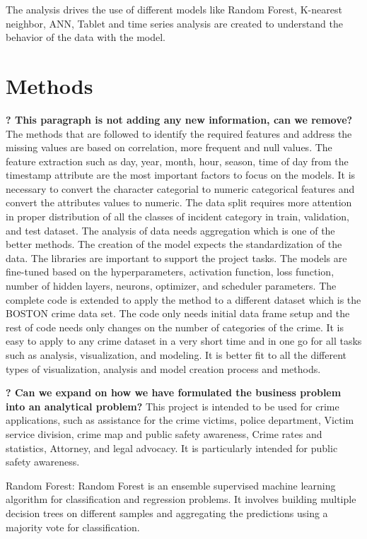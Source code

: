 \documentclass[conference,final,]{IEEEtran}
\begin{document}
The analysis drives the use of different models like Random Forest,
K-nearest neighbor, ANN, Tablet and time series analysis are created to
understand the behavior of the data with the model.

\section{Methods}\label{methods}

\textbf{? This paragraph is not adding any new information, can we
remove?} The methods that are followed to identify the required features
and address the missing values are based on correlation, more frequent
and null values. The feature extraction such as day, year, month, hour,
season, time of day from the timestamp attribute are the most important
factors to focus on the models. It is necessary to convert the character
categorial to numeric categorical features and convert the attributes
values to numeric. The data split requires more attention in proper
distribution of all the classes of incident category in train,
validation, and test dataset. The analysis of data needs aggregation
which is one of the better methods. The creation of the model expects
the standardization of the data. The libraries are important to support
the project tasks. The models are fine-tuned based on the
hyperparameters, activation function, loss function, number of hidden
layers, neurons, optimizer, and scheduler parameters. The complete code
is extended to apply the method to a different dataset which is the
BOSTON crime data set. The code only needs initial data frame setup and
the rest of code needs only changes on the number of categories of the
crime. It is easy to apply to any crime dataset in a very short time and
in one go for all tasks such as analysis, visualization, and modeling.
It is better fit to all the different types of visualization, analysis
and model creation process and methods.

\textbf{? Can we expand on how we have formulated the business problem
into an analytical problem?} This project is intended to be used for
crime applications, such as assistance for the crime victims, police
department, Victim service division, crime map and public safety
awareness, Crime rates and statistics, Attorney, and legal advocacy. It
is particularly intended for public safety awareness.

Random Forest: Random Forest is an ensemble supervised machine learning
algorithm for classification and regression problems. It involves
building multiple decision trees on different samples and aggregating
the predictions using a majority vote for classification.
\end{document}
